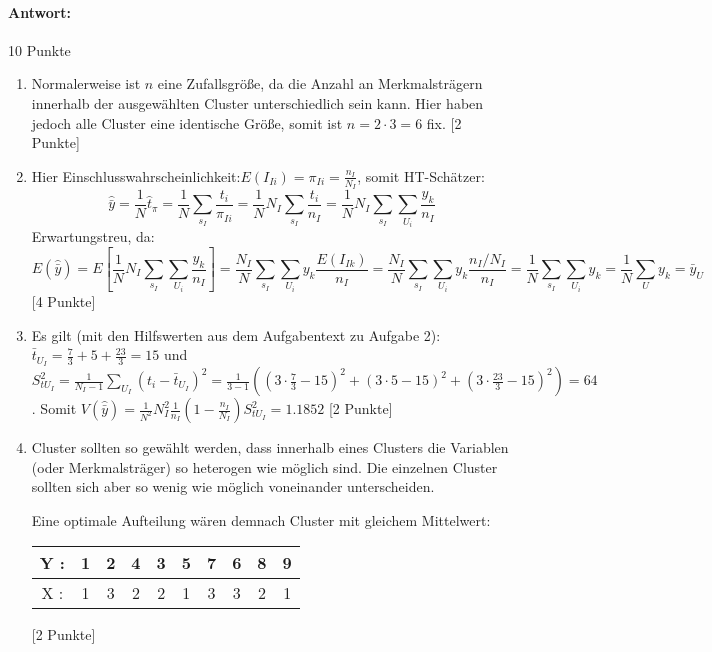 \documentclass{article}
\begin{document}
\paragraph{Antwort:}
\begin{solution} 10 Punkte
	\begin{enumerate}
		\item Normalerweise ist $n$ eine Zufallsgröße, da die Anzahl an Merkmalsträgern innerhalb der ausgewählten Cluster unterschiedlich sein kann. Hier haben jedoch alle Cluster eine identische Größe, somit ist $n=2\cdot3 =6$ fix.  [2 Punkte]
		\item Hier Einschlusswahrscheinlichkeit:$E(I_{Ii})=\pi_{Ii} = \frac{n_I}{N_I}$, somit HT-Schätzer: 
		$$\hat{\bar{y}}=\frac{1}{N}\hat{t}_\pi = \frac{1}{N}\sum_{s_I} \frac{t_i}{\pi_{Ii}}= \frac{1}{N}N_I \sum_{s_I} \frac{t_i}{n_I}= \frac{1}{N} N_I \sum_{s_I} \sum_{U_i} \frac{y_k}{n_I}$$
		Erwartungstreu, da:
		$$E(\hat{\bar{y}}) = E[\frac{1}{N} N_I \sum_{s_I} \sum_{U_i} \frac{y_k}{n_I}] = \frac{N_I}{N} \sum_{s_I} \sum_{U_i} y_k \frac{E(I_{Ik})}{n_I} = \frac{N_I}{N} \sum_{s_I} \sum_{U_i} y_k \frac{n_I/N_I}{n_I} = \frac{1}{N} \sum_{s_I} \sum_{U_i} y_k = \frac{1}{N} \sum_U y_k = \bar{y}_U$$ [4 Punkte]
		\item Es gilt (mit den Hilfswerten aus dem Aufgabentext zu Aufgabe 2): $\bar{t}_{U_I}= \frac{7}{3}+5+\frac{23}{3}=15$ und $S_{t U_I}^2 = \frac{1}{N_I -1}\sum_{U_I} (t_i - \bar{t}_{U_I})^2=\frac{1}{3-1}\left((3\cdot\frac{7}{3}-15)^2 + (3\cdot 5-15)^2+(3 \cdot\frac{23}{3}-15)^2\right)=64$. Somit $V(\hat{\bar{y}})= \frac{1}{N^2} N_I^2 \frac{1}{n_I}(1-\frac{n_I}{N_I}) S_{tU_I}^2 = 1.1852$ [2 Punkte]
		\item Cluster sollten so gewählt werden, dass innerhalb eines Clusters die Variablen (oder Merkmalsträger) so heterogen wie möglich sind. Die einzelnen Cluster sollten sich aber so wenig wie möglich voneinander unterscheiden.
		
		Eine optimale Aufteilung wären demnach Cluster mit gleichem Mittelwert:
		\begin{center}
			\begin{tabular}{c|c|c|c|c|c|c|c|c|c}	 
				Y : & 1 & 2 & 4 & 3 & 5 & 7 & 6 & 8 & 9 \\ 
				\hline 
				X : & 1 & 3 & 2 & 2 & 1 & 3 & 3 & 2 & 1 
			\end{tabular} 
		\end{center}
		[2 Punkte]
	\end{enumerate}
\end{solution}
~\newpage
\end{document}

